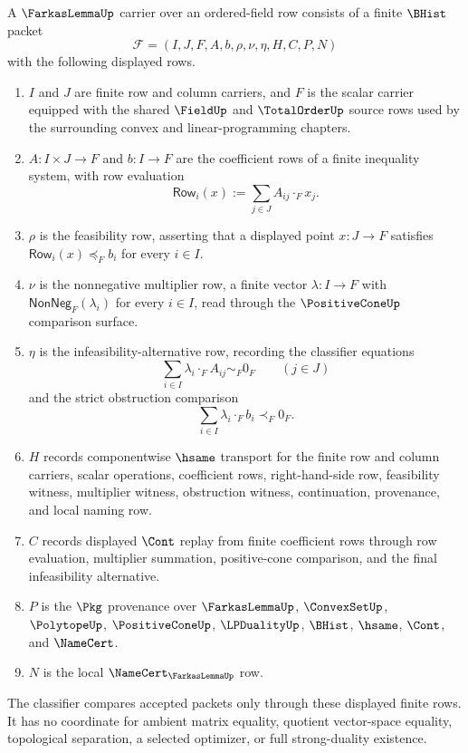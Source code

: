\begin{definition}
\label{def:farkas-lemma-carrier}
A $\FarkasLemmaUp$ carrier over an ordered-field row consists of a finite $\BHist$ packet
$$
\mathcal F=(I,J,F,A,b,\rho,\nu,\eta,H,C,P,N)
$$
with the following displayed rows.
\begin{enumerate}
\item $I$ and $J$ are finite row and column carriers, and $F$ is the scalar carrier equipped with the shared $\FieldUp$ and $\TotalOrderUp$ source rows used by the surrounding convex and linear-programming chapters.
\item $A:I\times J\to F$ and $b:I\to F$ are the coefficient rows of a finite inequality system, with row evaluation
$$
\mathsf{Row}_{i}(x):=\sum_{j\in J}A_{ij}\cdot_F x_j .
$$
\item $\rho$ is the feasibility row, asserting that a displayed point $x:J\to F$ satisfies $\mathsf{Row}_{i}(x)\preceq_F b_i$ for every $i\in I$.
\item $\nu$ is the nonnegative multiplier row, a finite vector $\lambda:I\to F$ with $\mathsf{NonNeg}_F(\lambda_i)$ for every $i\in I$, read through the $\PositiveConeUp$ comparison surface.
\item $\eta$ is the infeasibility-alternative row, recording the classifier equations
$$
\sum_{i\in I}\lambda_i\cdot_F A_{ij}\sim_F0_F
\qquad (j\in J)
$$
and the strict obstruction comparison
$$
\sum_{i\in I}\lambda_i\cdot_F b_i\prec_F0_F .
$$
\item $H$ records componentwise $\hsame$ transport for the finite row and column carriers, scalar operations, coefficient rows, right-hand-side row, feasibility witness, multiplier witness, obstruction witness, continuation, provenance, and local naming row.
\item $C$ records displayed $\Cont$ replay from finite coefficient rows through row evaluation, multiplier summation, positive-cone comparison, and the final infeasibility alternative.
\item $P$ is the $\Pkg$ provenance over $\FarkasLemmaUp$, $\ConvexSetUp$, $\PolytopeUp$, $\PositiveConeUp$, $\LPDualityUp$, $\BHist$, $\hsame$, $\Cont$, and $\NameCert$.
\item $N$ is the local $\NameCert_{\FarkasLemmaUp}$ row.
\end{enumerate}
The classifier compares accepted packets only through these displayed finite rows. It has no coordinate for ambient matrix equality, quotient vector-space equality, topological separation, a selected optimizer, or full strong-duality existence.
\end{definition}

